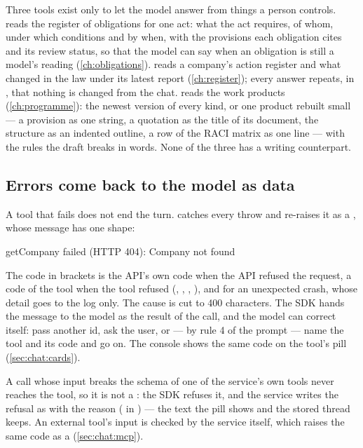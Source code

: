 Three tools exist only to let the model answer from things a person controls.
 reads the register of obligations for one act: what the act requires, of
whom, under which conditions and by when, with the provisions each obligation cites and its
review status, so that the model can say when an obligation is still a model's reading
(\cref{ch:obligations}).  reads a company's action register and what
changed in the law under its latest report (\cref{ch:register}); every answer repeats, in
, that nothing is changed from the chat.  reads the work
products (\cref{ch:programme}): the newest version of every kind, or one product rebuilt
small --- a provision as one string, a quotation as the title of its document, the structure
as an indented outline, a row of the RACI matrix as one line --- with the rules the draft
breaks in words. None of the three has a writing counterpart.

\subsection{Errors come back to the model as data}\label{sec:chat:toolerrors}

A tool that fails does not end the turn.  catches every throw and re-raises it
as a , whose message has one shape:

\begin{codeblock}
 getCompany failed (HTTP 404): Company not found
\end{codeblock}

The code in brackets is the API's own code when the API refused the request, a code of the
tool when the tool refused (, ,
, ), and  for an unexpected crash,
whose detail goes to the log only. The cause is cut to 400 characters. The SDK hands the message
to the model as the result of the call, and the model can correct itself: pass another id, ask
the user, or --- by rule 4 of the prompt --- name the tool and its code and go on. The console
shows the same code on the tool's pill (\cref{sec:chat:cards}).

A call whose input breaks the schema of one of the service's own tools never reaches the tool,
so it is not a : the SDK refuses it, and the service writes the refusal as
 with the reason ( in ) ---
the text the pill shows and the stored thread keeps. An external tool's input is checked by the
service itself, which raises the same code as a  (\cref{sec:chat:mcp}).


